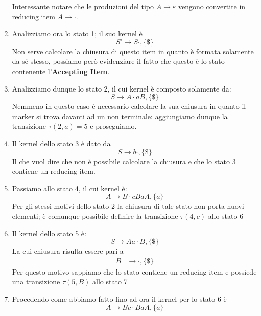 \documentclass[class=book, crop=false, oneside, 12pt]{standalone}
\begin{document}
\begin{enumerate}
    Interessante notare che le produzioni del tipo \(A \to \varepsilon\) vengono convertite in reducing item \(A \to \cdot\).
    \item Analizziamo ora lo stato 1; il suo kernel è 
    \begin{equation*}
        S' \to S \cdot, \{\$\}    
    \end{equation*}
    Non serve calcolare la chiusura di questo item in quanto è formata solamente da sé stesso, possiamo però evidenziare il fatto che questo è lo stato contenente l'\textbf{Accepting Item}.
    \item Analizziamo dunque lo stato 2, il cui kernel è composto solamente da:
    \begin{equation*}
        S \to  A \cdot aB, \{\$\}
    \end{equation*}
    Nemmeno in questo caso è necessario calcolare la sua chiusura in quanto il marker si trova davanti ad un non terminale: aggiungiamo dunque la transizione \(\tau(2,a)=5 \) e proseguiamo.
    \item Il kernel dello stato 3 è dato da
    \begin{equation*}
        S \to b \cdot, \{\$\}
    \end{equation*}
    Il che vuol dire che non è possibile calcolare la chiusura e che lo stato 3 contiene un reducing item.
    \item Passiamo allo stato 4, il cui kernel è:
    \begin{equation*}
        A \to B \cdot cBaA, \{a\} 
    \end{equation*}
   Per gli stessi motivi dello stato 2 la chiusura di tale stato non porta nuovi elementi; è comunque possibile definire la transizione \(\tau(4,c)\) allo stato 6
    \item Il kernel dello stato 5 è:
    \begin{equation*}
        S \to  Aa \cdot B, \{\$\}
    \end{equation*}
    La cui chiusura risulta essere pari a 
    \begin{align*}
        B &\to \cdot, \{\$\}
    \end{align*}
    Per questo motivo sappiamo che lo stato contiene un reducing item e possiede una transizione \(\tau(5, B)\) allo stato 7
    \item Procedendo come abbiamo fatto fino ad ora il kernel per lo stato 6 è
    \begin{equation*}
        A \to Bc \cdot BaA, \{a\} 
    \end{equation*}

\end{enumerate}
\end{document}
